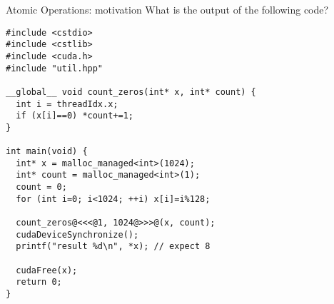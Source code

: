 \documentclass[aspectratio=43]{beamer}
\begin{document}
\begin{frame}[fragile]{Atomic Operations: motivation}
    What is the output of the following code?
    \begin{code}{}
        \begin{lstlisting}[style=boxcudatiny]
#include <cstdio>
#include <cstlib>
#include <cuda.h>
#include "util.hpp"

__global__ void count_zeros(int* x, int* count) {
  int i = threadIdx.x;
  if (x[i]==0) *count+=1;
}

int main(void) {
  int* x = malloc_managed<int>(1024);
  int* count = malloc_managed<int>(1);
  count = 0;
  for (int i=0; i<1024; ++i) x[i]=i%128;

  count_zeros@<<<@1, 1024@>>>@(x, count);
  cudaDeviceSynchronize();
  printf("result %d\n", *x); // expect 8

  cudaFree(x);
  return 0;
}
        \end{lstlisting}
    \end{code}

\end{frame}
\end{document}
